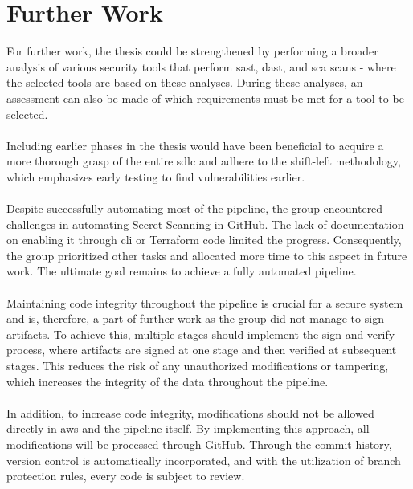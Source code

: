 \section{Further Work}
For further work, the thesis could be strengthened by performing a broader analysis of various security tools that perform \acrshort{sast}, \acrshort{dast}, and \acrshort{sca} scans -  where the selected tools are based on these analyses. During these analyses, an assessment can also be made of which requirements must be met for a tool to be selected. 
\\~\\
Including earlier phases in the thesis would have been beneficial to acquire a more thorough grasp of the entire \acrlong{sdlc} and adhere to the shift-left methodology, which emphasizes early testing to find vulnerabilities earlier.   
\\~\\
Despite successfully automating most of the \gls{pipeline}, the group encountered challenges in automating Secret Scanning in GitHub. The lack of documentation on enabling it through \acrshort{cli} or Terraform code limited the progress. Consequently, the group prioritized other tasks and allocated more time to this aspect in future work. The ultimate goal remains to achieve a fully automated \gls{pipeline}. 
\\~\\
Maintaining code integrity throughout the \gls{pipeline} is crucial for a secure system and is, therefore, a part of further work as the group did not manage to sign artifacts. To achieve this, multiple stages should implement the sign and verify process, where artifacts are signed at one stage and then verified at subsequent stages. This reduces the risk of any unauthorized modifications or tampering, which increases the integrity of the data throughout the \gls{pipeline}.
\\~\\
In addition, to increase code integrity, modifications should not be allowed directly in \acrshort{aws} and the \gls{pipeline} itself. By implementing this approach, all modifications will be processed through GitHub. Through the commit history, version control is automatically incorporated, and with the utilization of branch protection rules, every code is subject to review.
\newpage

